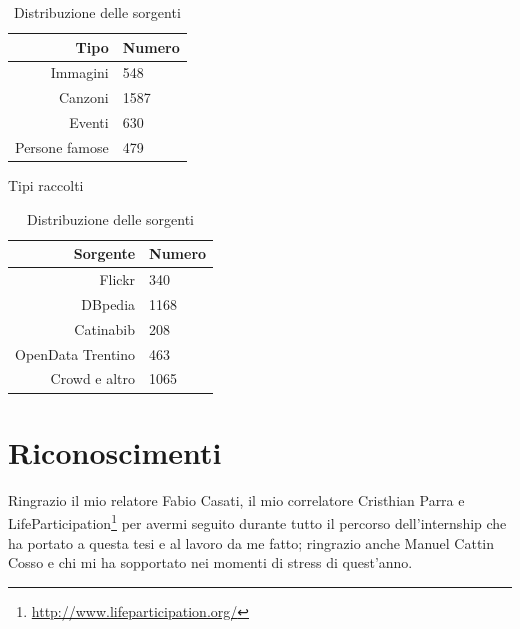 \documentclass{acm_proc_article-sp}
\begin{document}


\begin{table}
\parbox{.45\linewidth}{
\centering
\begin{tabular}{|r|l|}
\hline
Tipo & Numero \\
\hline
Immagini & 548 \\
Canzoni & 1587 \\
Eventi & 630 \\
Persone famose & 479 \\
\hline
\end{tabular}
\caption{Tipi raccolti}
\label{tab:entitykind}
}
\hfill
\parbox{.45\linewidth}{
\centering
\begin{tabular}{|r|l|}
\hline
Sorgente & Numero \\
\hline
Flickr & 340 \\
DBpedia & 1168 \\
Catinabib & 208 \\
OpenData Trentino & 463 \\
Crowd e altro & 1065 \\
\hline
\end{tabular}
\caption{Distribuzione delle sorgenti}
\label{tab:entitysource}
}
\end{table}





\section{Riconoscimenti}
Ringrazio il mio relatore Fabio Casati, il mio correlatore Cristhian Parra e LifeParticipation\footnote{\url{http://www.lifeparticipation.org/}} per avermi seguito durante tutto il percorso dell'internship che ha portato a questa tesi e al lavoro da me fatto; ringrazio anche Manuel Cattin Cosso e chi mi ha sopportato nei momenti di stress di quest'anno.

%

%
%
\appendix






\balancecolumns
\end{document}
